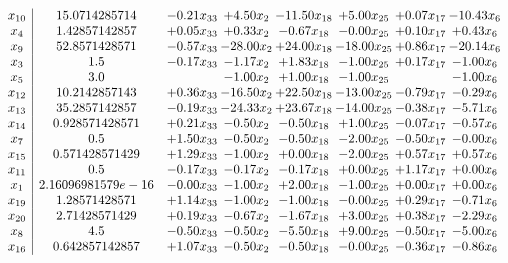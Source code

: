 \documentclass[8pt]{article}
\begin{document}
\[\begin{array}{c| c c@{\hskip 2pt} c@{\hskip 2pt} c@{\hskip 2pt} c@{\hskip 2pt} c@{\hskip 2pt} c@{\hskip 2pt} }
 x_{10}   &  15.0714285714 & -0.21 x_{33} & +  4.50 x_{2} & -11.50 x_{18} & +  5.00 x_{25} & +  0.07 x_{17} & -10.43 x_{6}\\
 x_{4}   &  1.42857142857 & +  0.05 x_{33} & +  0.33 x_{2} & -0.67 x_{18} & -0.00 x_{25} & +  0.10 x_{17} & +  0.43 x_{6}\\
 x_{9}   &  52.8571428571 & -0.57 x_{33} & -28.00 x_{2} & + 24.00 x_{18} & -18.00 x_{25} & +  0.86 x_{17} & -20.14 x_{6}\\
 x_{3}   &  1.5 & -0.17 x_{33} & -1.17 x_{2} & +  1.83 x_{18} & -1.00 x_{25} & +  0.17 x_{17} & -1.00 x_{6}\\
 x_{5}   &  3.0  &   & -1.00 x_{2} & +  1.00 x_{18} & -1.00 x_{25} &   & -1.00 x_{6}\\
 x_{12}   &  10.2142857143 & +  0.36 x_{33} & -16.50 x_{2} & + 22.50 x_{18} & -13.00 x_{25} & -0.79 x_{17} & -0.29 x_{6}\\
 x_{13}   &  35.2857142857 & -0.19 x_{33} & -24.33 x_{2} & + 23.67 x_{18} & -14.00 x_{25} & -0.38 x_{17} & -5.71 x_{6}\\
 x_{14}   &  0.928571428571 & +  0.21 x_{33} & -0.50 x_{2} & -0.50 x_{18} & +  1.00 x_{25} & -0.07 x_{17} & -0.57 x_{6}\\
 x_{7}   &  0.5 & +  1.50 x_{33} & -0.50 x_{2} & -0.50 x_{18} & -2.00 x_{25} & -0.50 x_{17} & -0.00 x_{6}\\
 x_{15}   &  0.571428571429 & +  1.29 x_{33} & -1.00 x_{2} & +  0.00 x_{18} & -2.00 x_{25} & +  0.57 x_{17} & +  0.57 x_{6}\\
 x_{11}   &  0.5 & -0.17 x_{33} & -0.17 x_{2} & -0.17 x_{18} & +  0.00 x_{25} & +  1.17 x_{17} & +  0.00 x_{6}\\
 x_{1}   &  2.16096981579e-16 & -0.00 x_{33} & -1.00 x_{2} & +  2.00 x_{18} & -1.00 x_{25} & +  0.00 x_{17} & +  0.00 x_{6}\\
 x_{19}   &  1.28571428571 & +  1.14 x_{33} & -1.00 x_{2} & -1.00 x_{18} & -0.00 x_{25} & +  0.29 x_{17} & -0.71 x_{6}\\
 x_{20}   &  2.71428571429 & +  0.19 x_{33} & -0.67 x_{2} & -1.67 x_{18} & +  3.00 x_{25} & +  0.38 x_{17} & -2.29 x_{6}\\
 x_{8}   &  4.5 & -0.50 x_{33} & -0.50 x_{2} & -5.50 x_{18} & +  9.00 x_{25} & -0.50 x_{17} & -5.00 x_{6}\\
 x_{16}   &  0.642857142857 & +  1.07 x_{33} & -0.50 x_{2} & -0.50 x_{18} & -0.00 x_{25} & -0.36 x_{17} & -0.86 x_{6}\\

\end{array}\]
\end{document}
